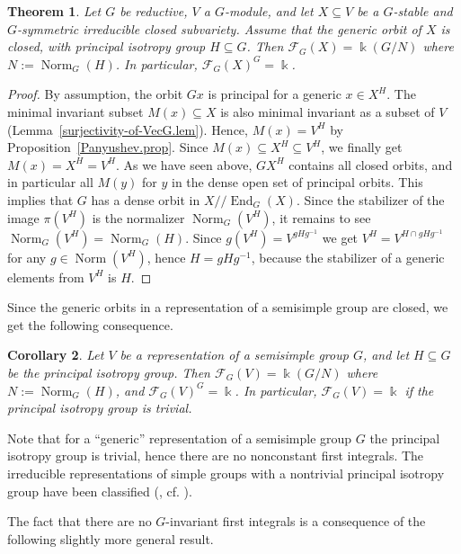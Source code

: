\documentclass{amsart}
\newtheorem{thm}{Theorem}[section]
\newtheorem{cor}[thm]{Corollary}
\theoremstyle{definition}
\theoremstyle{remark}
\begin{document}
\begin{thm}\label{first-integrals.thm}
Let $G$ be reductive, $V$ a $G$-module, and let $X {\subseteq} V$ be a $G$-stable and $G$-symmetric irreducible closed subvariety. Assume that the generic orbit of $X$ is closed, with principal isotropy group $H {\subseteq} G$. Then ${\mathcal F}_{G}(X) = {\Bbbk}(G/N)$ where $N := \operatorname{Norm}_{G}(H)$. In particular, ${\mathcal F}_{G}(X)^{G}={\Bbbk}$.
\end{thm}
\begin{proof}
By assumption, the orbit $Gx$ is principal for a generic $x \in X^{H}$.  The minimal invariant subset $M(x) {\subseteq} X$ is also minimal invariant as a subset of $V$ (Lemma~\ref{surjectivity-of-VecG.lem}).  Hence,  $M(x) = V^{H}$ by Proposition~\ref{Panyushev.prop}. Since $M(x) {\subseteq} X^{H}{\subseteq} V^{H}$, we finally get $M(x) = X^{H}=V^{H}$. As we have seen above, $G X^{H}$ contains all closed orbits, and in particular all $M(y)$ for $y$ in the dense open set of principal orbits. This implies that $G$ has a dense orbit in $X{/\!\!/}\operatorname{End}_{G}(X)$. Since the stabilizer of the image $\pi(V^{H})$ is the normalizer $\operatorname{Norm}_{G}(V^{H})$, it remains to see $\operatorname{Norm}_{G}(V^{H})=\operatorname{Norm}_{G}(H)$. Since $g(V^{H}) = V^{gHg^{-1}}$  we get $V^{H}=V^{H\cap gHg^{-1}}$ for any $g\in\operatorname{Norm}(V^{H})$, hence $H = gHg^{-1}$, because the stabilizer of a generic elements from $V^{H}$ is $H$.  
\end{proof}
Since the generic orbits in a representation of a semisimple group are closed, we get the following consequence.
\begin{cor}
Let $V$ be a representation of a semisimple group $G$, and let  $H {\subseteq} G$ be the principal isotropy group. Then ${\mathcal F}_{G}(V) = {\Bbbk}(G/N)$ where $N := \operatorname{Norm}_{G}(H)$, and ${\mathcal F}_{G}(V)^{G}={\Bbbk}$. In particular, ${\mathcal F}_{G}(V) = {\Bbbk}$ if the principal isotropy group is trivial.
\end{cor}
Note that for a ``generic'' representation of a semisimple group $G$ the principal isotropy group is trivial, hence there are no nonconstant first integrals. The irreducible representations of simple groups with a nontrivial principal isotropy group have been classified (\cite{AnViEl1967Orbits-of-highest-}, cf. \cite[\S7]{ViPo1994Invariant-theory}).

The fact that there are no $G$-invariant first integrals is a consequence of the following slightly more general result.
\end{document}
